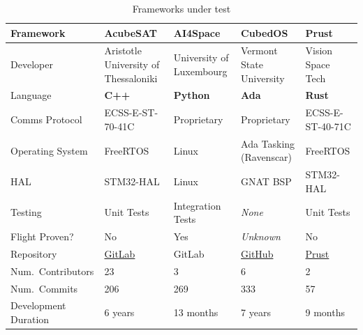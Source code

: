 \documentclass[a4paper,nobib,justified,final]{tufte-book}
\begin{document}
\begin{table}[h]
	\renewcommand{\arraystretch}{1.1}
	\begin{tabularx}{\textwidth}{@{}p{3cm}XXXX@{}}
		\toprule
		Framework  & AcubeSAT & AI4Space & CubedOS & Prust  \\ \midrule
		Developer  & Aristotle University of Thessaloniki &  University of Luxembourg & Vermont State University & Vision Space Tech \\
		Language & \textbf{C++} & \textbf{Python} & \textbf{Ada} & \textbf{Rust} \\
		Comms Protocol & ECSS-E-ST-70-41C & Proprietary & Proprietary  & ECSS-E-ST-40-71C \\
		Operating System & FreeRTOS & Linux & Ada Tasking (Ravenscar) & FreeRTOS \\
		\acs{HAL} & STM32-HAL & Linux & GNAT BSP & STM32-HAL \\[2ex]
		Testing & Unit Tests & Integration Tests & \emph{None} & Unit Tests \\ 
		Flight Proven? & No & Yes & \emph{Unknown} & No \\
		Repository & \href{https://gitlab.com/acubesat/obc/obc-software}{GitLab}
		& GitLab
		& \href{https://github.com/cubesatlab/cubedos}{GitHub}
		& \href{https://github.com/visionspacetec/Prust}{Prust}
		\\ \midrule
		Num.~Contributors & 23 & 3 & 6 & 2 \\
		Num.~Commits & 206 & 269 & 333 & 57 \\
		Development Duration &
		6 years &
		13 months &
		7 years &
		9 months
		\\ \bottomrule
	\end{tabularx}
	\caption{Frameworks under test}
	\label{tab:m_software_fuzz_frameworks}
\end{table}
\end{document}
